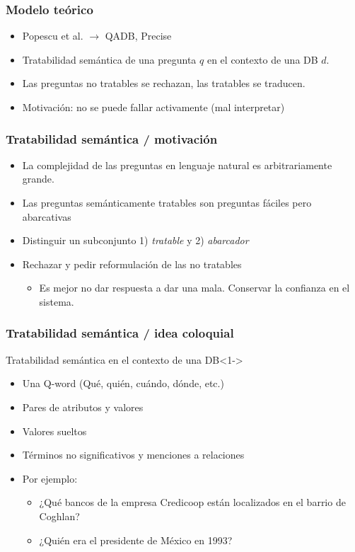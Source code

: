 \begin{frame}
  \frametitle{Modelo teórico}
      \begin{itemize}
          \item Popescu et al. $\rightarrow$ QADB, Precise
          \item Tratabilidad semántica de una pregunta $q$ en el contexto de una DB $d$.
          \item Las preguntas no tratables se rechazan, las tratables se traducen.
          \item Motivación: no se puede fallar activamente (mal interpretar)
      \end{itemize}
\end{frame}





\begin{frame}
  \frametitle{Tratabilidad semántica / motivación}
      \begin{itemize}
          \item La complejidad de las preguntas en lenguaje natural es arbitrariamente grande.
          \item Las preguntas semánticamente tratables son preguntas fáciles pero abarcativas
          \item Distinguir un subconjunto 1) \textit{tratable} y 2) \textit{abarcador}
          \item Rechazar y pedir reformulación de las no tratables
          \begin{itemize}
            \item Es mejor no dar respuesta a dar una mala. Conservar la confianza en el sistema.
          \end{itemize}
      \end{itemize}
\end{frame}

\begin{frame}
  \frametitle{Tratabilidad semántica / idea coloquial}
    \begin{block}{Tratabilidad semántica en el contexto de una DB}<1->
      \begin{itemize}
          \item Una Q-word (Qué, quién, cuándo, dónde, etc.)
          \item Pares de atributos y valores
          \item Valores sueltos
          \item Términos no significativos y menciones a relaciones
          \item Por ejemplo:
            \begin{itemize}
              \item ¿{\color{green}Qué} {\color{orange}bancos} de la {\color{red}empresa Credicoop} están localizados en el {\color{blue}barrio} de {\color{blue}Coghlan}?
              \item ¿{\color{green}Quién} era el {\color{red}presidente} de {\color{red}México} en {\color{orange}1993}?
            \end{itemize}
      \end{itemize}
    \end{block}
\end{frame}

